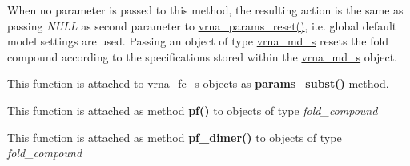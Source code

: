\begin{DoxyRefList}
When no parameter is passed to this method, the resulting action is the same as passing {\itshape N\+U\+LL} as second parameter to \hyperlink{group__energy__parameters_gac40dc82e48a72a97cfc58b9da08a7792}{vrna\+\_\+params\+\_\+reset()}, i.\+e. global default model settings are used. Passing an object of type \hyperlink{structvrna__md__s}{vrna\+\_\+md\+\_\+s} resets the fold compound according to the specifications stored within the \hyperlink{structvrna__md__s}{vrna\+\_\+md\+\_\+s} object.  
\item[\label{wrappers__wrappers000044}%
\hypertarget{wrappers__wrappers000044}{}%
Global \hyperlink{group__energy__parameters_ga5d1909208f7ea3baa98b75afaa1f62ca}{vrna\+\_\+params\+\_\+subst} (vrna\+\_\+fold\+\_\+compound\+\_\+t $\ast$vc, vrna\+\_\+param\+\_\+t $\ast$par)]This function is attached to \hyperlink{group__fold__compound_structvrna__fc__s}{vrna\+\_\+fc\+\_\+s} objects as {\bfseries params\+\_\+subst()} method.  
\item[\label{wrappers__wrappers000048}%
\hypertarget{wrappers__wrappers000048}{}%
Global \hyperlink{group__pf__fold_ga29e256d688ad221b78d37f427e0e99bc}{vrna\+\_\+pf} (vrna\+\_\+fold\+\_\+compound\+\_\+t $\ast$vc, char $\ast$structure)]This function is attached as method {\bfseries pf()} to objects of type {\itshape fold\+\_\+compound}  
\item[\label{wrappers__wrappers000049}%
\hypertarget{wrappers__wrappers000049}{}%
Global \hyperlink{group__pf__cofold_ga4e5c7d06c302a7c59fc0d64dc142ca63}{vrna\+\_\+pf\+\_\+dimer} (vrna\+\_\+fold\+\_\+compound\+\_\+t $\ast$vc, char $\ast$structure)]This function is attached as method {\bfseries pf\+\_\+dimer()} to objects of type {\itshape fold\+\_\+compound}  
\item[\label{wrappers__wrappers000016}%
\hypertarget{wrappers__wrappers000016}{}%
Global \hyperlink{group__soft__constraints_gaf162aedac7422f2eb16ea030f47d2f4b}{vrna\+\_\+sc\+\_\+add\+\_\+bp} (vrna\+\_\+fold\+\_\+compound\+\_\+t $\ast$vc, int i, int j, F\+L\+T\+\_\+\+O\+R\+\_\+\+D\+BL energy, unsigned int options)]


\end{DoxyRefList}
